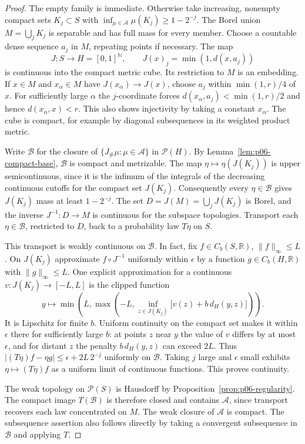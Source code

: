\documentclass[11pt,oneside,openany]{book}
\newcommand{\R}{\mathbb{R}}
\newcommand{\N}{\mathbb{N}}
\theoremstyle{plain}
\theoremstyle{definition}
\theoremstyle{remark}
\begin{document}
\begin{proof}
The empty family is immediate. Otherwise take increasing, nonempty
compact sets \(K_j\subset S\) with
\(\inf_{\mu\in\mathcal A}\mu(K_j)\geq1-2^{-j}\). The Borel union
\(M=\bigcup_j K_j\) is separable and has full mass for every member.
Choose a countable dense sequence \(a_j\) in \(M\), repeating points
if necessary. The map
\[
 J:S\longrightarrow H=[0,1]^{\N},\qquad
 J(x)_j=\min(1,d(x,a_j))
\]
is continuous into the compact metric cube. Its restriction to
\(M\) is an embedding. If \(x\in M\) and \(x_\alpha\in M\) have
\(J(x_\alpha)\to J(x)\), choose \(a_j\) within
\(\min(1,r)/4\) of \(x\). For sufficiently large \(\alpha\) the
\(j\)-coordinate forces \(d(x_\alpha,a_j)<\min(1,r)/2\) and hence
\(d(x_\alpha,x)<r\). This also shows injectivity by taking a constant
\(x_\alpha\). The cube is compact, for example by diagonal
subsequences in its weighted product metric.

Write \(\mathcal B\) for the closure of
\(\{J_\#\mu:\mu\in\mathcal A\}\) in \(\mathcal P(H)\). By
Lemma~\ref{lem:p06-compact-base}, \(\mathcal B\) is compact and
metrizable. The map \(\eta\mapsto\eta(J(K_j))\) is upper
semicontinuous, since it is the infimum of the integrals of the
decreasing continuous cutoffs for the compact set \(J(K_j)\).
Consequently every \(\eta\in\mathcal B\) gives \(J(K_j)\) mass at
least \(1-2^{-j}\). The set \(D=J(M)=\bigcup_j J(K_j)\) is Borel,
and the inverse \(J^{-1}:D\to M\) is continuous for the subspace
topologies. Transport each \(\eta\in\mathcal B\), restricted to \(D\),
back to a probability law \(T\eta\) on \(S\).

This transport is weakly continuous on \(\mathcal B\).
In fact, fix \(f\in C_b(S,\R)\), \(\lVert f\rVert_\infty\leq L\).
On \(J(K_j)\) approximate \(f\circ J^{-1}\) uniformly within
\(\epsilon\) by a function \(g\in C_b(H,\R)\) with
\(\lVert g\rVert_\infty\leq L\). One explicit approximation for a
continuous \(v:J(K_j)\to[-L,L]\) is the clipped function
\[
 y\longmapsto
  \min\!\left(L,\max\!\left(-L,\inf_{z\in J(K_j)}
           \bigl[v(z)+b\,d_H(y,z)\bigr]\right)\right).
\]
It is Lipschitz for finite \(b\). Uniform continuity on the compact
set makes it within \(\epsilon\) there for sufficiently large \(b\):
at points \(z\) near \(y\) the value of \(v\) differs by at most
\(\epsilon\), and for distant \(z\) the penalty \(b\,d_H(y,z)\)
can exceed \(2L\). Thus
\(\lvert (T\eta)f-\eta g\rvert\leq\epsilon+2L\,2^{-j}\) uniformly
on \(\mathcal B\). Taking \(j\) large and \(\epsilon\) small
exhibits \(\eta\mapsto (T\eta)f\) as a uniform limit of continuous
functions. This proves continuity.

The weak topology on \(\mathcal P(S)\) is Hausdorff by
Proposition~\ref{prop:p06-regularity}. The compact image
\(T(\mathcal B)\) is therefore closed and contains \(\mathcal A\),
since transport recovers each law concentrated on \(M\). The weak
closure of \(\mathcal A\) is compact. The subsequence assertion
also follows directly by taking a convergent subsequence in
\(\mathcal B\) and applying \(T\).
\end{proof}
\end{document}
